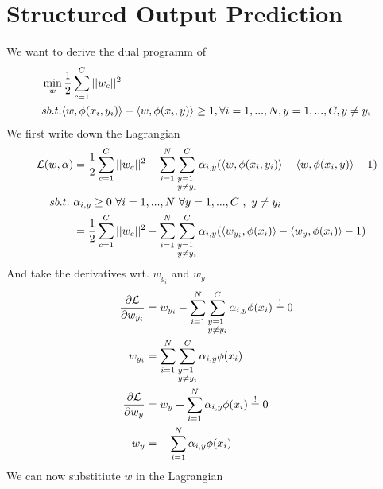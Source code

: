 
\section*{Structured Output Prediction} 
We want to derive the dual programm of
\begin{align}
	&\min_w \frac{1}{2} \sum_{c=1}^C ||w_c||^2\\
	&sb.t. \langle w, \phi(x_i,y_i)\rangle - \langle w, \phi(x_i,y)\rangle \geq 1 , \forall i=1,...,N, y=1,...,C,y \neq y_i \notag
\end{align}
We first write down the Lagrangian
\begin{align}
	\mathcal{L}(w,\alpha) &=
	\frac{1}{2} \sum_{c=1}^C ||w_c||^2 - 
	\sum_{i=1}^N \sum_{\begin{subarray}{l} y=1 \\ y\neq y_i \end{subarray}}^C
	\alpha_{i,y}(\langle w, \phi(x_i,y_i)\rangle - \langle w, \phi(x_i,y)\rangle - 1 ) \\
	sb.t. ~ &\alpha_{i,y} \geq 0 ~ \forall i = 1,...,N ~ \forall y = 1,...,C ~ ,~ y\neq y_i\notag \\
	&= \frac{1}{2} \sum_{c=1}^C ||w_c||^2 - \sum_{i=1}^N \sum_{\begin{subarray}{l} y=1 \\ y\neq y_i \end{subarray}}^C \alpha_{i,y}(\langle w_{y_i}, \phi(x_i)\rangle - \langle w_y, \phi(x_i)\rangle - 1 ) 
\end{align}
And take the derivatives wrt. $w_{y_i}$ and $w_y$
\begin{align}
	\frac{\partial \mathcal{L}}{\partial w_{y_i}} &= w_{y_i} - 
	\sum_{i=1}^N \sum_{\begin{subarray}{l} y=1 \\ y\neq y_i \end{subarray}}^C
	\alpha_{i,y} \phi(x_i) \stackrel{!}{=} 0 \\
	w_{y_i} &= \sum_{i=1}^N \sum_{\begin{subarray}{l} y=1 \\ y\neq y_i \end{subarray}}^C
	\alpha_{i,y} \phi(x_i) \\
	\frac{\partial \mathcal{L}}{\partial w_{y}} &= w_{y} + 
	\sum_{i=1}^N 
	\alpha_{i,y} \phi(x_i) \stackrel{!}{=} 0 \\
	w_{y} &= - \sum_{i=1}^N \alpha_{i,y} \phi(x_i)
\end{align}
We can now substitiute $w$ in the Lagrangian
